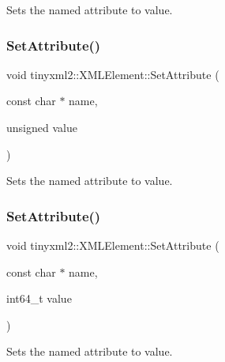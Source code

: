Sets the named attribute to value. 

\mbox{\label{classtinyxml2_1_1_x_m_l_element_ae143997e90064ba82326b29a9930ea8f}} 
\subsubsection{\texorpdfstring{Set\+Attribute()}{SetAttribute()}\hspace{0.1cm}{\footnotesize\ttfamily [3/7]}}
{\footnotesize\ttfamily void tinyxml2\+::\+X\+M\+L\+Element\+::\+Set\+Attribute (\begin{DoxyParamCaption}\item[{const char $\ast$}]{name,  }\item[{unsigned}]{value }\end{DoxyParamCaption})\hspace{0.3cm}{\ttfamily [inline]}}



Sets the named attribute to value. 

\mbox{\label{classtinyxml2_1_1_x_m_l_element_aaeefdf9171fec91b13a776b42299b0dd}} 
\subsubsection{\texorpdfstring{Set\+Attribute()}{SetAttribute()}\hspace{0.1cm}{\footnotesize\ttfamily [4/7]}}
{\footnotesize\ttfamily void tinyxml2\+::\+X\+M\+L\+Element\+::\+Set\+Attribute (\begin{DoxyParamCaption}\item[{const char $\ast$}]{name,  }\item[{int64\+\_\+t}]{value }\end{DoxyParamCaption})\hspace{0.3cm}{\ttfamily [inline]}}



Sets the named attribute to value. 

